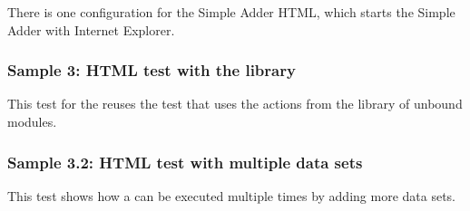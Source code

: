 There is one \gdaut{} configuration for the Simple Adder HTML, which starts the Simple Adder with Internet Explorer. 


\subsubsection{Sample 3: HTML test with the library}

This test for the reuses the test that uses the actions from the library of unbound modules.

\subsubsection{Sample 3.2: HTML test with multiple data sets}
This test shows how a \gdcase{} can be executed multiple times by adding more data sets.
